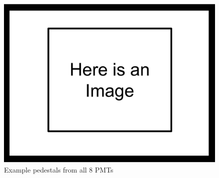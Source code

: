 \begin{figure}[h] 
\centering
\includegraphics[scale=.25]{3-UCNAAnalysis/ImageHolder.pdf}
\caption{Example pedestals from all 8 PMTs}
\label{fig:peds_ind}
\end{figure}
\fi

